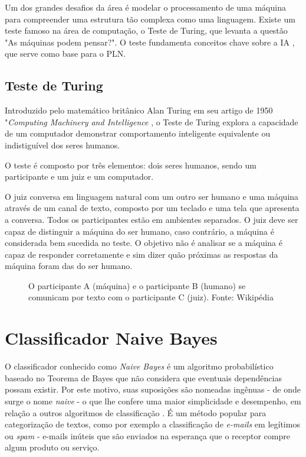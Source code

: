 Um dos grandes desafios da área é modelar o processamento de uma máquina para compreender uma estrutura tão complexa como uma linguagem. Existe um teste famoso na área de computação, o Teste de Turing, que levanta a questão "As máquinas podem pensar?". O teste fundamenta conceitos chave sobre a \ac{IA} , que serve como base para o PLN.

\subsection{Teste de Turing}

Introduzido pelo matemático britânico Alan Turing em seu artigo de 1950 "\textit{Computing Machinery and Intelligence} \cite{turing1950computing}, o Teste de Turing explora a capacidade de um computador demonstrar comportamento inteligente equivalente ou indistiguível dos seres humanos.

O teste é composto por três elementos: dois seres humanos, sendo um participante e um juiz e um computador.

O juiz conversa em linguagem natural com um outro ser humano e uma máquina através de um canal de texto, composto por um teclado e uma tela que apresenta a conversa. Todos os participantes estão em ambientes separados. O juiz deve ser capaz de distinguir a máquina do ser humano, caso contrário, a máquina é considerada bem sucedida no teste. O objetivo não é analisar se a máquina é capaz de responder corretamente e sim dizer quão próximas as respostas da máquina foram das do ser humano.  

\begin{figure}[H]
	\centering{}
	\caption{O participante A (máquina) e o participante B (humano) se comunicam por texto com o participante C (juiz). Fonte: Wikipédia}
	\label{uni}
\end{figure}


\section{Classificador Naive Bayes}\label{sec:naive_bayes}
O classificador conhecido como \textit{Naive Bayes} é um algoritmo probabilístico baseado no Teorema de Bayes que não considera que eventuais dependências possam existir. Por este motivo, suas suposições são nomeadas ingênuas - de onde surge o nome \textit{naive} - o que lhe confere uma maior simplicidade e desempenho, em relação a outros algoritmos de classificação \cite{rennie2003tackling}. É um método popular para categorização de textos, como por exemplo a classificação de \textit{e-mails} em legítimos ou \textit{spam} - e-mails inúteis que são enviados na esperança que o receptor compre algum produto ou serviço. \cite{androutsopoulos2000evaluation}

